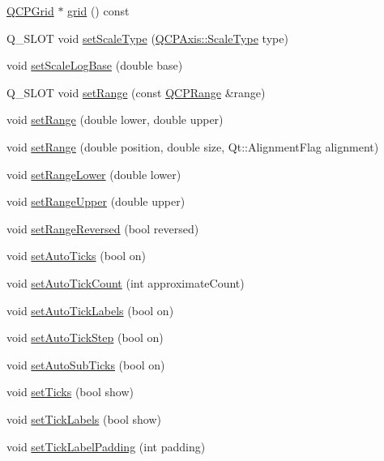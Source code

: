 \begin{DoxyCompactItemize}
\item 
\hyperlink{classQCPGrid}{Q\+C\+P\+Grid} $\ast$ \hyperlink{classQCPAxis_ac4fb913cce3072b5e75a4635e0f6cd04}{grid} () const 
\item 
Q\+\_\+\+S\+L\+OT void \hyperlink{classQCPAxis_adef29cae617af4f519f6c40d1a866ca6}{set\+Scale\+Type} (\hyperlink{classQCPAxis_a36d8e8658dbaa179bf2aeb973db2d6f0}{Q\+C\+P\+Axis\+::\+Scale\+Type} type)
\item 
void \hyperlink{classQCPAxis_a726186054be90487885a748aa1b42188}{set\+Scale\+Log\+Base} (double base)
\item 
Q\+\_\+\+S\+L\+OT void \hyperlink{classQCPAxis_aebdfea5d44c3a0ad2b4700cd4d25b641}{set\+Range} (const \hyperlink{classQCPRange}{Q\+C\+P\+Range} \&range)
\item 
void \hyperlink{classQCPAxis_a57d6ee9e9009fe88cb19db476ec70bca}{set\+Range} (double lower, double upper)
\item 
void \hyperlink{classQCPAxis_acf60e5b2d631fbc8c4548c3d579cb6d0}{set\+Range} (double position, double size, Qt\+::\+Alignment\+Flag alignment)
\item 
void \hyperlink{classQCPAxis_afcf51227d337db28d1a9ce9a4d1bc91a}{set\+Range\+Lower} (double lower)
\item 
void \hyperlink{classQCPAxis_acd3ca1247aa867b540cd5ec30ccd3bef}{set\+Range\+Upper} (double upper)
\item 
void \hyperlink{classQCPAxis_a2172fdb196b1a0dc3f40992fcad8e9e1}{set\+Range\+Reversed} (bool reversed)
\item 
void \hyperlink{classQCPAxis_ae867c23d3a6a7bd4d09cc66c5d018f63}{set\+Auto\+Ticks} (bool on)
\item 
void \hyperlink{classQCPAxis_a7c7111cbeac9ec5fcb40f93a1ef51a0b}{set\+Auto\+Tick\+Count} (int approximate\+Count)
\item 
void \hyperlink{classQCPAxis_aaa47e3a6bac0c20d4beb9028f01bc1a1}{set\+Auto\+Tick\+Labels} (bool on)
\item 
void \hyperlink{classQCPAxis_a99fe77b034e06f5b723995beab96e741}{set\+Auto\+Tick\+Step} (bool on)
\item 
void \hyperlink{classQCPAxis_adcbdec7a60054b88571e89599f4a45bf}{set\+Auto\+Sub\+Ticks} (bool on)
\item 
void \hyperlink{classQCPAxis_ac891409315bc379e3b1abdb162c1a011}{set\+Ticks} (bool show)
\item 
void \hyperlink{classQCPAxis_a04ba16e1f6f78d70f938519576ed32c8}{set\+Tick\+Labels} (bool show)
\item 
void \hyperlink{classQCPAxis_af302c479af9dbc2e9f0e44e07c0012ee}{set\+Tick\+Label\+Padding} (int padding)

\end{DoxyCompactItemize}
